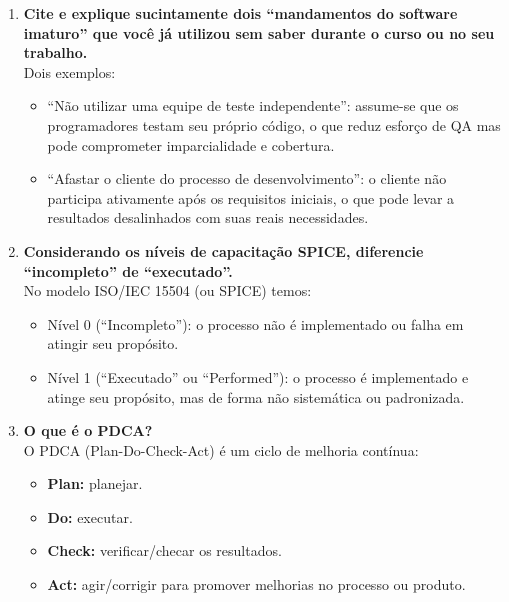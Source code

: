 \documentclass[12pt]{article}
\begin{document}
\begin{enumerate}[label=\textbf{\arabic*.}]
  \item \textbf{Cite e explique sucintamente dois “mandamentos do software imaturo” que você já utilizou sem saber durante o curso ou no seu trabalho.} \\
    Dois exemplos: \\
    \begin{itemize}
      \item “Não utilizar uma equipe de teste independente”: assume-se que os programadores testam seu próprio código, o que reduz esforço de QA mas pode comprometer imparcialidade e cobertura. \\
      \item “Afastar o cliente do processo de desenvolvimento”: o cliente não participa ativamente após os requisitos iniciais, o que pode levar a resultados desalinhados com suas reais necessidades.
    \end{itemize}

  \item \textbf{Considerando os níveis de capacitação \textsc{SPICE}, diferencie “incompleto” de “executado”.} \\
    No modelo \textsc{ISO/IEC} 15504 (ou SPICE) temos: \\
    \begin{itemize}
      \item Nível 0 (“Incompleto”): o processo não é implementado ou falha em atingir seu propósito. \\
      \item Nível 1 (“Executado” ou “Performed”): o processo é implementado e atinge seu propósito, mas de forma não sistemática ou padronizada.
    \end{itemize}

  \item \textbf{O que é o PDCA?} \\
    O PDCA (Plan-Do-Check-Act) é um ciclo de melhoria contínua: \\
    \begin{itemize}
      \item \textbf{Plan:} planejar. \\
      \item \textbf{Do:} executar. \\
      \item \textbf{Check:} verificar/checar os resultados. \\
      \item \textbf{Act:} agir/corrigir para promover melhorias no processo ou produto.
    \end{itemize}

\end{enumerate}
\end{document}
